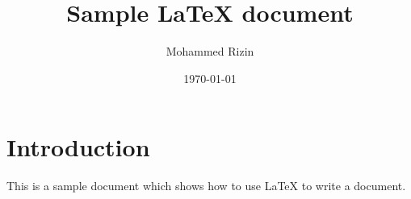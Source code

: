 \documentclass{article}
\title{Sample \LaTeX{} document}
\author{Mohammed Rizin}
\date{\today}
\begin{document}
\maketitle

\section{Introduction}

This is a sample document which shows how to use \LaTeX{} to write a document.
\end{document}
